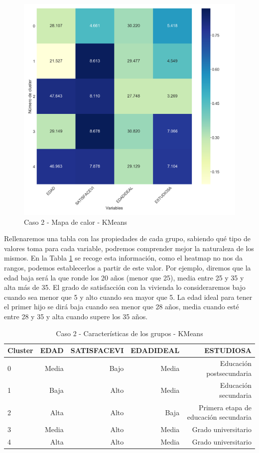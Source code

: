 \documentclass[a4paper, 20pt]{article}
\begin{document}
\begin{figure}[H]
    \centering
    \includegraphics[width=1\textwidth]{./caso2/KMeans_heatmap}
    \caption{Caso 2 - Mapa de calor - KMeans}
    \label{fig:KMeans_heatmap2}
\end{figure}

Rellenaremos una tabla con las propiedades de cada grupo, sabiendo qué tipo de valores toma para cada variable, podremos comprender mejor la naturaleza de los mismos. En la Tabla \ref{tab:KMeans_carac2} se recoge esta información, como el heatmap no nos da rangos, podemos establecerlos a partir de este valor. Por ejemplo, diremos que la edad baja será la que ronde los 20 años (menor que 25), media entre 25 y 35 y alta más de 35. El grado de satisfacción con la vivienda lo consideraremos bajo cuando sea menor que 5 y alto cuando sea mayor que 5. La edad ideal para tener el primer hijo se dirá baja cuando sea menor que 28 años, media cuando esté entre 28 y 35 y alta cuando supere los 35 años. 

\begin{table}[H]
\centering
\caption{Caso 2 - Características de los grupos - KMeans}
\label{tab:KMeans_carac2}
\begin{tabular}{lrrrr}
\toprule
Cluster & EDAD & SATISFACEVI & EDADIDEAL & ESTUDIOSA\\
\midrule
0 & Media & Bajo & Media & Educación postsecundaria \\
1 & Baja & Alto & Media & Educación secundaria \\
2 & Alta & Alto & Baja & Primera etapa de educación secundaria \\
3 & Media & Alto & Media & Grado universitario \\
4 & Alta & Alto & Media & Grado universitario \\
\bottomrule
\end{tabular}
\end{table}
\end{document}

